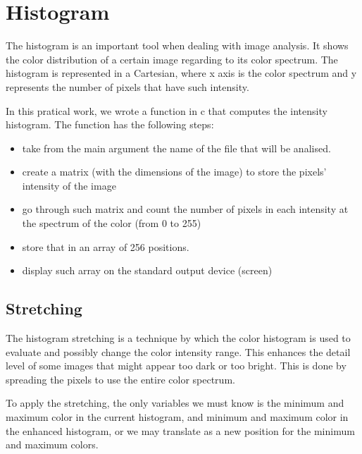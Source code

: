 \documentclass{article}
\begin{document}
\section{Histogram}

	The histogram is an important tool when dealing with image analysis. It shows the color distribution of a certain image regarding to its color spectrum. The 		histogram is represented in a Cartesian, where x axis is the color spectrum and y represents the number of pixels that have such intensity.

	In this pratical work, we wrote a function in c that computes the intensity histogram. The function has the following steps:
	\begin{itemize}
  		\item take from the main argument the name of the file that will be analised.
  		\item create a matrix (with the dimensions of the image) to store the pixels' intensity of the image
  		\item go through such matrix and count the number of pixels in each intensity at the spectrum of the color (from 0 to 255)
  		\item store that in an array of 256 positions.
  		\item display such array on the standard output device (screen)
	\end{itemize}

	\subsection{Stretching}

	The histogram stretching is a technique by which the color histogram is used to evaluate and possibly change the color intensity range. This enhances the 		detail level of some images that might appear too dark or too bright. This is done by spreading the pixels to use the entire color spectrum.
	
	To apply the stretching, the only variables we must know is the minimum and maximum color in the current histogram, and minimum and maximum color in the 		enhanced histogram, or we may translate as a new position for the minimum and maximum colors. 
\end{document}
